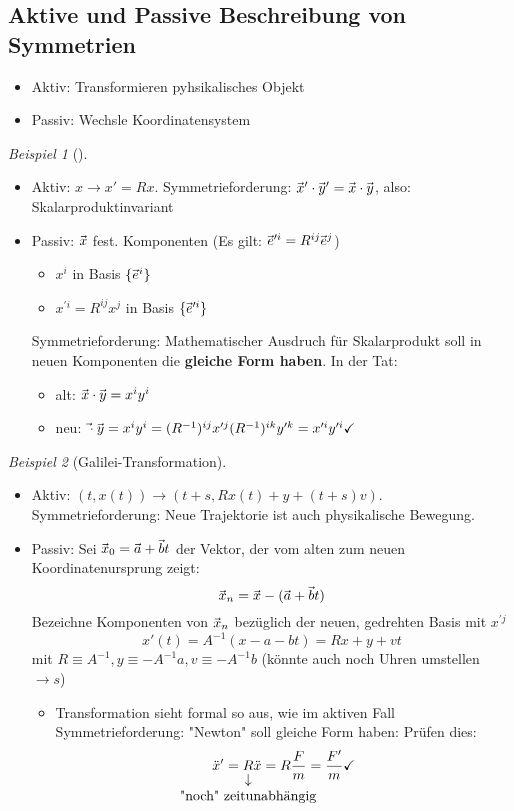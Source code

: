 \documentclass[a4paper]{scrartcl}
\renewcommand{\v}[1]{\mathrlap{\vec{\mkern-2mu\phantom{#1}}}#1}
\theoremstyle{definition}
\theoremstyle{plain}
\theoremstyle{remark}
\theoremstyle{remark}
\newtheorem{ex}{Beispiel}
\begin{document}
\subsection{Aktive und Passive Beschreibung von Symmetrien}
\label{sec-7-2}
\begin{itemize}
\item Aktiv: Transformieren pyhsikalisches Objekt
\item Passiv: Wechsle Koordinatensystem
\end{itemize}
\begin{ex}[]
\mbox{}
\begin{itemize}
\item Aktiv: $x \to x' = Rx$. Symmetrieforderung: $\v x' \cdot \v y' = \v x \cdot \v y$, also: Skalarproduktinvariant
\item Passiv: $\v x$ fest. Komponenten
(Es gilt: $\v e^{\prime i} = R^{ij} \v e^j$)
\begin{itemize}
\item $x^i$ in Basis $\{\v e^i\}$
\item $x^{\prime i} = R^{ij} x^j$ in Basis $\{\v e^{\prime i}\}$
\end{itemize}
Symmetrieforderung: Mathematischer Ausdruch für Skalarprodukt soll in neuen Komponenten die \textbf{gleiche Form haben}.
In der Tat:
\begin{itemize}
\item alt: $\v x \cdot \v y = x^i y^i$
\item neu: $\v \cdot \v y = x^i y^i = (R^{-1})^{ij} x^{\prime j} (R^{-1})^{ik} y^{\prime k} = x^{\prime i} y^{\prime i} \checkmark$
\end{itemize}
\end{itemize}
\end{ex}
\begin{ex}[Galilei-Transformation]
\begin{itemize}
\item Aktiv: $(t, x(t)) \to (t + s, R x(t) + y + (t + s) v)$. Symmetrieforderung: Neue
Trajektorie ist auch physikalische Bewegung.
\item Passiv: Sei $\v x_0 = \v a + \v b t$ der Vektor, der vom alten zum neuen Koordinatenursprung zeigt:
\[\v x_n = \v x - (\v a + \v b t)\]
Bezeichne Komponenten von $\v x_n$ bezüglich der neuen, gedrehten Basis mit $x^{\prime j}$
\[x'(t) = A^{-1}(x - a - bt) = Rx + y + v t\]
mit $R\equiv A^{-1}, y\equiv -A^{-1}a, v\equiv -A^{-1}b$ (könnte auch noch Uhren umstellen $\to s$)
\begin{itemize}
\item Transformation sieht formal so aus, wie im aktiven Fall \\
       Symmetrieforderung: "Newton" soll gleiche Form haben: Prüfen dies:
\[\ddot{x}' = \underarrow[R]{"noch" zeitunabhängig}\ddot{x} = R \frac{F}{m} = \frac{F'}{m} \checkmark\]
\end{itemize}
\end{itemize}
\end{ex}
\end{document}
